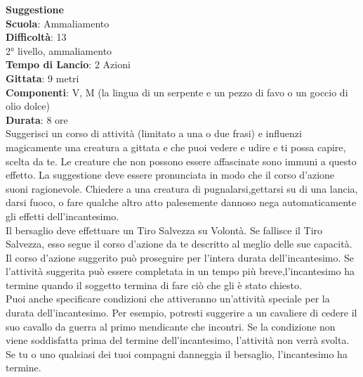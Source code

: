 \begin{multicols}{2}
\medskip\textbf{Suggestione}\\
\textbf{Scuola}: Ammaliamento\\
\textbf{Difficoltà}:  13\\
2° livello, ammaliamento\\
\textbf{Tempo di Lancio}: 2 Azioni\\
\textbf{Gittata}: 9 metri\\
\textbf{Componenti}: V, M (la lingua di un serpente e un pezzo di favo o un goccio di olio dolce)\\
\textbf{Durata}: 8 ore \\
Suggerisci un corso di attività (limitato a una o due frasi) e influenzi magicamente una creatura a gittata e che puoi vedere e udire e ti possa capire, scelta da te. Le creature che non possono essere affascinate sono immuni a questo effetto. La suggestione deve essere  pronunciata in modo che il corso d’azione suoni ragionevole. Chiedere a una creatura di pugnalarsi,gettarsi su di  una lancia, darsi fuoco, o fare qualche altro atto palesemente dannoso nega automaticamente  gli effetti dell'incantesimo.\\
Il bersaglio deve effettuare un Tiro Salvezza su Volontà. Se fallisce il Tiro Salvezza, esso segue il corso d’azione da te descritto al meglio delle sue capacità. Il corso d’azione suggerito può proseguire per l’intera durata dell'incantesimo. Se l’attività suggerita può essere completata in un tempo più breve,l'incantesimo ha termine quando il soggetto termina di fare ciò che gli è stato chiesto.\\
Puoi anche specificare condizioni che attiveranno un'attività speciale per la durata dell'incantesimo. Per esempio, potresti suggerire a un cavaliere di cedere il suo cavallo da guerra al primo mendicante che incontri.  Se la condizione non viene soddisfatta prima del termine  dell'incantesimo, l’attività non verrà svolta. Se tu o uno qualsiasi dei tuoi compagni danneggia il bersaglio, l'incantesimo ha termine.\\


\end{multicols}
